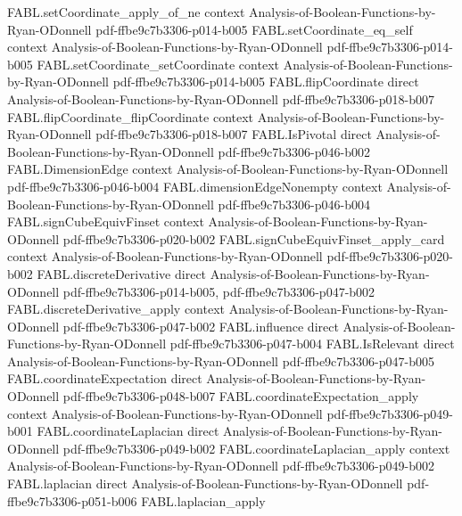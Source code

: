 \begin{theorem}
\proofstep
  {FABL.setCoordinate_apply_of_ne}
  {context}
  {Analysis-of-Boolean-Functions-by-Ryan-ODonnell}
  {pdf-ffbe9c7b3306-p014-b005}
\proofstep
  {FABL.setCoordinate_eq_self}
  {context}
  {Analysis-of-Boolean-Functions-by-Ryan-ODonnell}
  {pdf-ffbe9c7b3306-p014-b005}
\proofstep
  {FABL.setCoordinate_setCoordinate}
  {context}
  {Analysis-of-Boolean-Functions-by-Ryan-ODonnell}
  {pdf-ffbe9c7b3306-p014-b005}
\proofstep
  {FABL.flipCoordinate}
  {direct}
  {Analysis-of-Boolean-Functions-by-Ryan-ODonnell}
  {pdf-ffbe9c7b3306-p018-b007}
\proofstep
  {FABL.flipCoordinate_flipCoordinate}
  {context}
  {Analysis-of-Boolean-Functions-by-Ryan-ODonnell}
  {pdf-ffbe9c7b3306-p018-b007}
\proofstep
  {FABL.IsPivotal}
  {direct}
  {Analysis-of-Boolean-Functions-by-Ryan-ODonnell}
  {pdf-ffbe9c7b3306-p046-b002}
\proofstep
  {FABL.DimensionEdge}
  {context}
  {Analysis-of-Boolean-Functions-by-Ryan-ODonnell}
  {pdf-ffbe9c7b3306-p046-b004}
\proofstep
  {FABL.dimensionEdgeNonempty}
  {context}
  {Analysis-of-Boolean-Functions-by-Ryan-ODonnell}
  {pdf-ffbe9c7b3306-p046-b004}
\proofstep
  {FABL.signCubeEquivFinset}
  {context}
  {Analysis-of-Boolean-Functions-by-Ryan-ODonnell}
  {pdf-ffbe9c7b3306-p020-b002}
\proofstep
  {FABL.signCubeEquivFinset_apply_card}
  {context}
  {Analysis-of-Boolean-Functions-by-Ryan-ODonnell}
  {pdf-ffbe9c7b3306-p020-b002}
\proofstep
  {FABL.discreteDerivative}
  {direct}
  {Analysis-of-Boolean-Functions-by-Ryan-ODonnell}
  {pdf-ffbe9c7b3306-p014-b005,
    pdf-ffbe9c7b3306-p047-b002}
\proofstep
  {FABL.discreteDerivative_apply}
  {context}
  {Analysis-of-Boolean-Functions-by-Ryan-ODonnell}
  {pdf-ffbe9c7b3306-p047-b002}
\proofstep
  {FABL.influence}
  {direct}
  {Analysis-of-Boolean-Functions-by-Ryan-ODonnell}
  {pdf-ffbe9c7b3306-p047-b004}
\proofstep
  {FABL.IsRelevant}
  {direct}
  {Analysis-of-Boolean-Functions-by-Ryan-ODonnell}
  {pdf-ffbe9c7b3306-p047-b005}
\proofstep
  {FABL.coordinateExpectation}
  {direct}
  {Analysis-of-Boolean-Functions-by-Ryan-ODonnell}
  {pdf-ffbe9c7b3306-p048-b007}
\proofstep
  {FABL.coordinateExpectation_apply}
  {context}
  {Analysis-of-Boolean-Functions-by-Ryan-ODonnell}
  {pdf-ffbe9c7b3306-p049-b001}
\proofstep
  {FABL.coordinateLaplacian}
  {direct}
  {Analysis-of-Boolean-Functions-by-Ryan-ODonnell}
  {pdf-ffbe9c7b3306-p049-b002}
\proofstep
  {FABL.coordinateLaplacian_apply}
  {context}
  {Analysis-of-Boolean-Functions-by-Ryan-ODonnell}
  {pdf-ffbe9c7b3306-p049-b002}
\proofstep
  {FABL.laplacian}
  {direct}
  {Analysis-of-Boolean-Functions-by-Ryan-ODonnell}
  {pdf-ffbe9c7b3306-p051-b006}
\proofstep
  {FABL.laplacian_apply}

\end{theorem}
